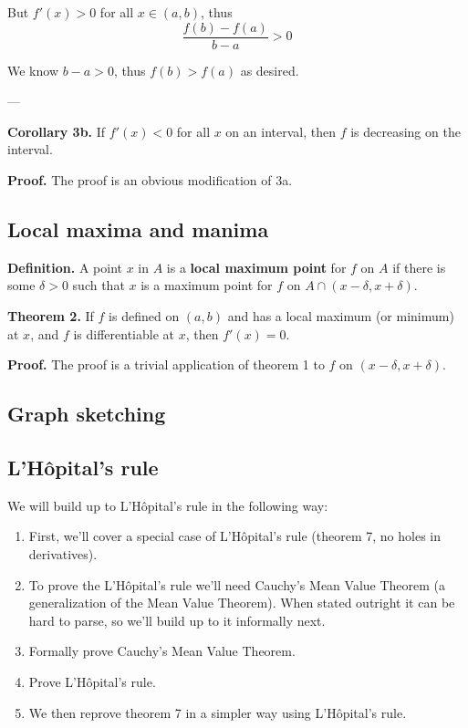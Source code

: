 But $f'(x)>0$ for all $x\in(a,b)$, thus
\[\frac{f(b)-f(a)}{b-a}>0\]

We know $b-a>0$, thus $f(b)>f(a)$ as desired.

\vs---\vs

\textbf{Corollary 3b.} If $f'(x)<0$ for all $x$ on an interval, then
$f$ is decreasing on the interval.

\vs

\textbf{Proof.} The proof is an obvious modification of 3a.

\subsection{Local maxima and manima}
\textbf{Definition.} A point $x$ in $A$ is a \textbf{local maximum
  point} for $f$ on $A$ if there is some $\delta>0$ such that $x$ is a
maximum point for $f$ on $A\cap(x-\delta, x+\delta)$.

\vs

\textbf{Theorem 2.} If $f$ is defined on $(a,b)$ and has a local
maximum (or minimum) at $x$, and $f$ is differentiable at $x$, then
$f'(x)=0$.

\vs

\textbf{Proof.} The proof is a trivial application of theorem 1 to $f$
on $(x-\delta, x+\delta)$.

\subsection{Graph sketching}

\subsection{L'H\^opital's rule}
We will build up to L'H\^opital's rule in the following way:

\begin{enumerate}
\item First, we'll cover a special case of L'H\^opital's rule (theorem
  7, no holes in derivatives).
\item To prove the L'H\^opital's rule we'll need Cauchy's Mean Value
  Theorem (a generalization of the Mean Value Theorem). When stated
  outright it can be hard to parse, so we'll build up to it informally
  next.
\item Formally prove Cauchy's Mean Value Theorem.
\item Prove L'H\^opital's rule.
\item We then reprove theorem 7 in a simpler way using L'H\^opital's
  rule.
\end{enumerate}


